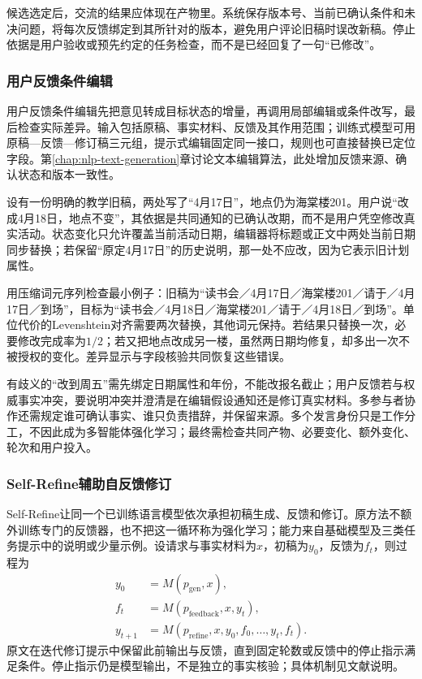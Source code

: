 候选选定后，交流的结果应体现在产物里。系统保存版本号、当前已确认条件和未决问题，将每次反馈绑定到其所针对的版本，避免用户评论旧稿时误改新稿。停止依据是用户验收或预先约定的任务检查，而不是已经回复了一句“已修改”。

\subsubsection{用户反馈条件编辑}
\label{sec:nlp-dialogue-feedback-edit}

用户反馈条件编辑先把意见转成目标状态的增量，再调用局部编辑或条件改写，最后检查实际差异。输入包括原稿、事实材料、反馈及其作用范围；训练式模型可用原稿—反馈—修订稿三元组，提示式编辑固定同一接口，规则也可直接替换已定位字段。第\ref{chap:nlp-text-generation}章讨论文本编辑算法，此处增加反馈来源、确认状态和版本一致性。

设有一份明确的教学旧稿，两处写了“4月17日”，地点仍为海棠楼201。用户说“改成4月18日，地点不变”，其依据是共同通知的已确认改期，而不是用户凭空修改真实活动。状态变化只允许覆盖当前活动日期，编辑器将标题或正文中两处当前日期同步替换；若保留“原定4月17日”的历史说明，那一处不应改，因为它表示旧计划属性。

用压缩词元序列检查最小例子：旧稿为“读书会／4月17日／海棠楼201／请于／4月17日／到场”，目标为“读书会／4月18日／海棠楼201／请于／4月18日／到场”。单位代价的Levenshtein对齐需要两次替换，其他词元保持。若结果只替换一次，必要修改完成率为$1/2$；若又把地点改成另一楼，虽然两日期均修复，却多出一次不被授权的变化。差异显示与字段核验共同恢复这些错误。

有歧义的“改到周五”需先绑定日期属性和年份，不能改报名截止；用户反馈若与权威事实冲突，要说明冲突并澄清是在编辑假设通知还是修订真实材料。多参与者协作还需规定谁可确认事实、谁只负责措辞，并保留来源。多个发言身份只是工作分工，不因此成为多智能体强化学习；最终需检查共同产物、必要变化、额外变化、轮次和用户投入。

\subsubsection{Self-Refine辅助自反馈修订}
\label{sec:nlp-dialogue-self-refine}

Self-Refine让同一个已训练语言模型依次承担初稿生成、反馈和修订。原方法不额外训练专门的反馈器，也不把这一循环称为强化学习；能力来自基础模型及三类任务提示中的说明或少量示例。设请求与事实材料为$x$，初稿为$y_0$，反馈为$f_t$，则过程为
\begin{equation}
\begin{aligned}
 y_0&=M(p_{\mathrm{gen}},x),\\
 f_t&=M(p_{\mathrm{feedback}},x,y_t),\\
 y_{t+1}&=M(p_{\mathrm{refine}},x,y_0,f_0,\ldots,y_t,f_t).
\end{aligned}
\label{eq:nlp-dialogue-self-refine}
\end{equation}
原文在迭代修订提示中保留此前输出与反馈，直到固定轮数或反馈中的停止指示满足条件。停止指示仍是模型输出，不是独立的事实核验；具体机制见文献说明。


